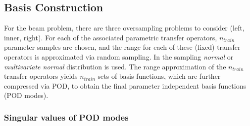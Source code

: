 \documentclass[a4paper]{eccomas_paper-2024}
\begin{document}
\subsection{Basis Construction}
For the beam problem, there are three oversampling problems to consider (left, inner, right).
For each of the associated parametric transfer operators, $n_{train}$ parameter samples are chosen, and
the range for each of these (fixed) transfer operators is approximated via random sampling. In
the sampling \textit{normal} or \textit{multivariate normal} distribution is used.
The range approximation of the $n_{train}$ transfer operators yields $n_{train}$ sets of
basis functions, which are further compressed via POD, to obtain the final parameter
independent basis functions (POD modes).

\subsubsection{Singular values of POD modes}
\end{document}
